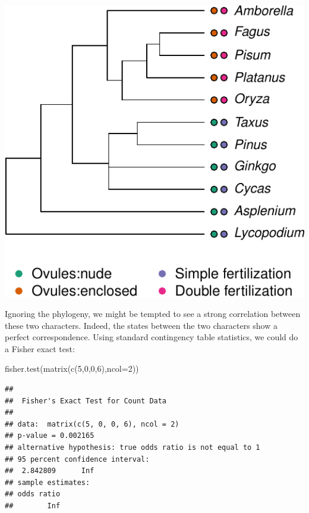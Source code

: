 \documentclass[
]{book}
\newenvironment{Shaded}{\begin{snugshade}}{\end{snugshade}}
\newcommand{\AttributeTok}[1]{\textcolor[rgb]{0.77,0.63,0.00}{#1}}
\newcommand{\DecValTok}[1]{\textcolor[rgb]{0.00,0.00,0.81}{#1}}
\newcommand{\FunctionTok}[1]{\textcolor[rgb]{0.00,0.00,0.00}{#1}}
\newcommand{\NormalTok}[1]{#1}
\begin{document}
\begin{center}\includegraphics{pcm-workshop_files/figure-latex/AngiospermsWithCharacters-1} \end{center}

Ignoring the phylogeny, we might be tempted to see a strong correlation between these two characters. Indeed, the states between the two characters show a perfect correspondence. Using standard contingency table statistics, we could do a Fisher exact test:

\begin{Shaded}
\begin{Highlighting}[]
\FunctionTok{fisher.test}\NormalTok{(}\FunctionTok{matrix}\NormalTok{(}\FunctionTok{c}\NormalTok{(}\DecValTok{5}\NormalTok{,}\DecValTok{0}\NormalTok{,}\DecValTok{0}\NormalTok{,}\DecValTok{6}\NormalTok{),}\AttributeTok{ncol=}\DecValTok{2}\NormalTok{))}
\end{Highlighting}
\end{Shaded}

\begin{verbatim}
## 
##  Fisher's Exact Test for Count Data
## 
## data:  matrix(c(5, 0, 0, 6), ncol = 2)
## p-value = 0.002165
## alternative hypothesis: true odds ratio is not equal to 1
## 95 percent confidence interval:
##  2.842809      Inf
## sample estimates:
## odds ratio 
##        Inf
\end{verbatim}
\end{document}
